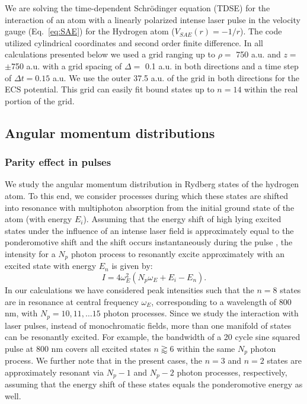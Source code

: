 We are solving the time-dependent Schr\"{o}dinger equation (TDSE) for the interaction of an atom with a linearly polarized intense laser pulse in the velocity gauge (Eq.~\ref{eq:SAE}) for the Hydrogen atom ($V_{SAE}(r)=-1/r$). The code utilized cylindrical coordinates and second order finite difference. In all calculations presented below we used a grid ranging up to $\rho=$ 750 a.u. and $z=$ $\pm$750 a.u. with a grid spacing of $\Delta =$ 0.1 a.u. in both directions and a time step of $\Delta t = 0.15$ a.u. We use the outer 37.5 a.u. of the grid in both directions for the ECS potential. This grid can easily fit bound states up to $n = 14$ within the real portion of the grid. 

\subsection{Angular momentum distributions}
\label{sub:angularmomentum}

\subsubsection{Parity effect in pulses}
\label{ssub:parity}
We study the angular momentum distribution in Rydberg states of the hydrogen atom. To this end, we consider processes during which these states are shifted into resonance with multiphoton absorption from the initial ground state of the atom (with energy $E_i$). Assuming that the energy shift of high lying excited states under the influence of an intense laser field is approximately equal to the ponderomotive shift \cite{agostini1989} and the shift occurs instantaneously during the pulse \cite{he2011}, the intensity for a $N_p$ photon process to resonantly excite  approximately with an excited state with energy $E_n$ is given by:
%
\begin{equation}
I = 4\omega_E^2(N_p\omega_E + E_i - E_n).
\end{equation}
%
In our calculations we have considered peak intensities such that the $n=8$ states are in resonance at central frequency $\omega_E$, corresponding to a wavelength of 800 nm, with $N_p = 10, 11, \ldots 15$ photon processes. Since we study the interaction with laser pulses, instead of monochromatic fields, more than one manifold of states can be resonantly excited. For example, the bandwidth of a 20 cycle sine squared pulse at 800 nm covers all excited states $n \gtrapprox 6$ within the same $N_p$ photon process. We further note that in the present cases, the $n=3$ and $n=2$ states are approximately resonant via $N_p-1$ and $N_p-2$ photon processes, respectively, assuming that the energy shift of these states equals the ponderomotive energy as well.

